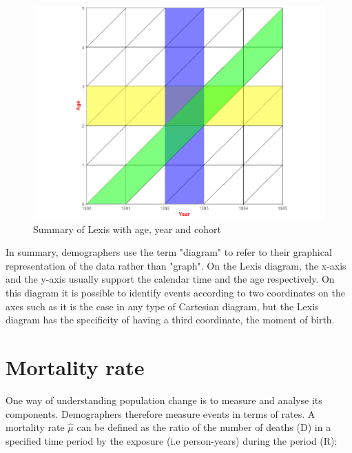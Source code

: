    

    
        
         \begin{figure}[tbh]
         \centering
          \includegraphics[scale=0.4]{figures/lexis_summary.png}
          \caption{Summary of Lexis with age, year and cohort}
          \label{fig:lexis 6}
        \end{figure}

        


 
In summary, demographers use the term "diagram" to refer to their graphical representation of the data rather than "graph".
On the Lexis diagram, the x-axis and the y-axis usually support the calendar time and the age respectively. On this diagram it is possible to identify events according to two coordinates on the axes such as it is the case in any type of Cartesian diagram, but the Lexis diagram has the specificity of having a third coordinate, the moment of birth.
\parencite{Wal17}

 

\section{Mortality rate} 

One way of understanding population change is to measure and analyse its components. Demographers therefore measure events in terms of rates. 
A mortality rate $\hat{\mu}$ can be defined as the ratio of the number of deaths (D) in a specified time period by the exposure (i.e person-years) during the period (R): 


